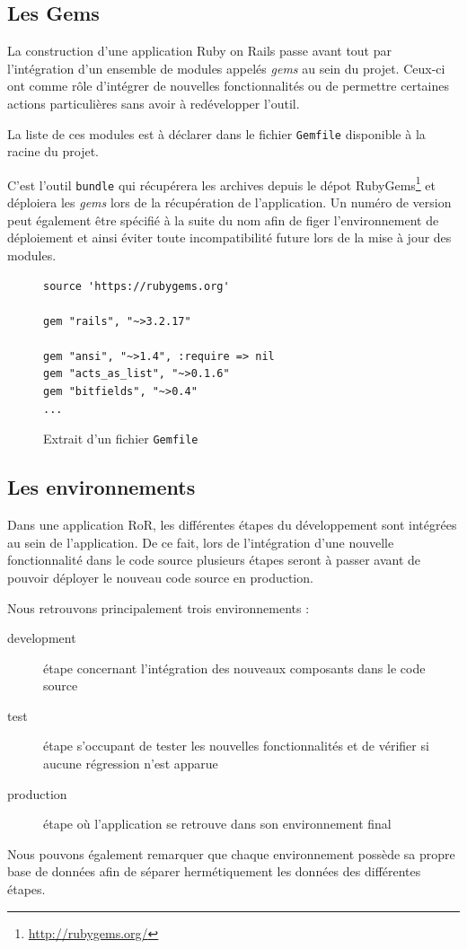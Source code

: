 \documentclass[12pt,a4paper]{book}
\begin{document}
\subsection{Les Gems}

La construction d'une application Ruby on Rails passe avant tout par l'intégration d'un ensemble de modules appelés \textit{gems} au sein du projet. Ceux-ci ont comme rôle d'intégrer de nouvelles fonctionnalités ou de permettre certaines actions particulières sans avoir à redévelopper l'outil. 

La liste de ces modules est à déclarer dans le fichier \texttt{Gemfile} disponible à la racine du projet.

C'est l'outil \texttt{bundle} qui récupérera les archives depuis le dépot RubyGems\footnote{\url{http://rubygems.org/}} et déploiera les \textit{gems} lors de la récupération de l'application. Un numéro de version peut également être spécifié à la suite du nom afin de figer l'environnement de déploiement et ainsi éviter toute incompatibilité future lors de la mise à jour des modules.

\begin{figure}[h]
\lstset{language=ruby}
\begin{lstlisting}
source 'https://rubygems.org'

gem "rails", "~>3.2.17"

gem "ansi", "~>1.4", :require => nil
gem "acts_as_list", "~>0.1.6"
gem "bitfields", "~>0.4"
...
\end{lstlisting}
 \caption{Extrait d'un fichier \texttt{Gemfile}}
\end{figure}

\subsection{Les environnements}

Dans une application RoR, les différentes étapes du développement sont intégrées au sein de l'application. De ce fait, lors de l'intégration d'une nouvelle fonctionnalité dans le code source plusieurs étapes seront à passer avant de pouvoir déployer le nouveau code source en production.

Nous retrouvons principalement trois environnements :
\begin{description}
	\item[development] étape concernant l'intégration des nouveaux composants dans le code source
	\item[test] étape s'occupant de tester les nouvelles fonctionnalités et de vérifier si aucune régression n'est apparue 
	\item[production] étape où l'application se retrouve dans son environnement final
\end{description}
Nous pouvons également remarquer que chaque environnement possède sa propre base de données afin de séparer hermétiquement les données des différentes étapes. 
\end{document}
